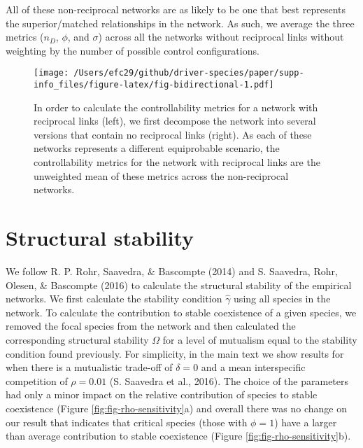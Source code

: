 \documentclass[a4paper]{artikel1}
\theoremstyle{definition}
\theoremstyle{definition}
\theoremstyle{definition}
\theoremstyle{remark}
\begin{document}
All of these non-reciprocal networks are as likely to be one that best
represents the superior/matched relationships in the network. As such,
we average the three metrics (\(n_D\), \(\phi\), and \(\sigma\)) across
all the networks without reciprocal links without weighting by the
number of possible control configurations.

\begin{figure}
\centering
\texttt{[image: /Users/efc29/github/driver-species/paper/supp-info\_files/figure-latex/fig-bidirectional-1.pdf]}
\caption{\label{fig:fig-bidirectional}In order to calculate the
controllability metrics for a network with reciprocal links (left), we
first decompose the network into several versions that contain no
reciprocal links (right). As each of these networks represents a
different equiprobable scenario, the controllability metrics for the
network with reciprocal links are the unweighted mean of these metrics
across the non-reciprocal networks.}
\end{figure}

\clearpage

\section{Structural stability}\label{structural-stability}

We follow R. P. Rohr, Saavedra, \& Bascompte (2014) and S. Saavedra,
Rohr, Olesen, \& Bascompte (2016) to calculate the structural stability
of the empirical networks. We first calculate the stability condition
\(\hat{\gamma}\) using all species in the network. To calculate the
contribution to stable coexistence of a given species, we removed the
focal species from the network and then calculated the corresponding
structural stability \(\Omega\) for a level of mutualism equal to the
stability condition found previously. For simplicity, in the main text
we show results for when there is a mutualistic trade-off of
\(\delta = 0\) and a mean interspecific competition of \(\rho = 0.01\)
(S. Saavedra et al., 2016). The choice of the parameters had only a
minor impact on the relative contribution of species to stable
coexistence (Figure \ref{fig:fig-rho-sensitivity}a) and overall there
was no change on our result that indicates that critical species (those
with \(\phi = 1\)) have a larger than average contribution to stable
coexistence (Figure \ref{fig:fig-rho-sensitivity}b).
\end{document}
